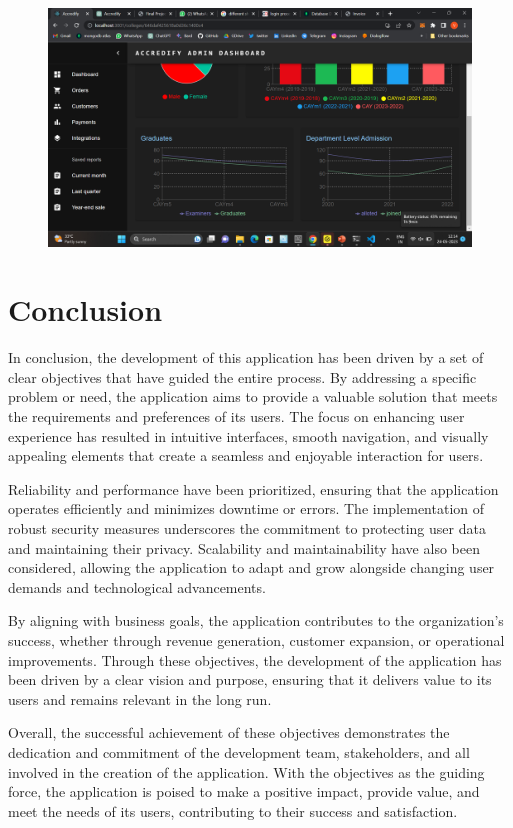 \documentclass[a4paper,11pt]{report}
\begin{document}
\begin{figure}[h]
	\centering
	\hspace{21pt}
	\includegraphics[width=.70\linewidth]{accredify14.png}
	\label{fig:logo.png}
\end{figure}




\chapter{Conclusion}
In conclusion, the development of this application has been driven by a set of clear objectives that have guided the entire process. By addressing a specific problem or need, the application aims to provide a valuable solution that meets the requirements and preferences of its users. The focus on enhancing user experience has resulted in intuitive interfaces, smooth navigation, and visually appealing elements that create a seamless and enjoyable interaction for users.

Reliability and performance have been prioritized, ensuring that the application operates efficiently and minimizes downtime or errors. The implementation of robust security measures underscores the commitment to protecting user data and maintaining their privacy. Scalability and maintainability have also been considered, allowing the application to adapt and grow alongside changing user demands and technological advancements.

By aligning with business goals, the application contributes to the organization's success, whether through revenue generation, customer expansion, or operational improvements. Through these objectives, the development of the application has been driven by a clear vision and purpose, ensuring that it delivers value to its users and remains relevant in the long run.

Overall, the successful achievement of these objectives demonstrates the dedication and commitment of the development team, stakeholders, and all involved in the creation of the application. With the objectives as the guiding force, the application is poised to make a positive impact, provide value, and meet the needs of its users, contributing to their success and satisfaction.
\end{document}
